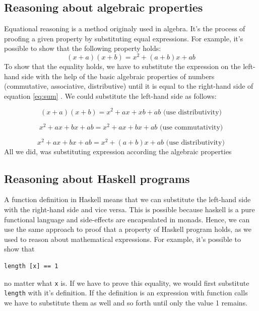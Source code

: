 \subsection{Reasoning about algebraic properties}

Equational reasoning is a method originaly used in algebra. It's the process of proofing a given property by substituting equal expressions.
For example, it's possible to show that the following property holds:
\begin{equation}
  \label{eq:sum}
  (x+a)(x+b) = x^2 + (a+b)x+ab
\end{equation}
To show that the equality holds, we have to substitute the expression on the left-hand side with the help of the basic algebraic properties of numbers (commutative, associative, distributive) until it is equal to the right-hand side of equation \ref{eq:sum} \cite{hutton}. We could substitute the left-hand side as follows:

\begin{equation}
  \label{eq:algebra}
  (x+a)(x+b) = x^2 + ax + xb + ab \text{     (use distributivity)}
\end{equation}

\begin{equation}
x^2 + ax + bx + ab = x^2 + ax + bx + ab \text{     (use commutativity)}
\end{equation}

\begin{equation}
x^2 + ax + bx + ab = x^2 + (a + b)x + ab \text{     (use distributivity)}
\end{equation}
All we did, was substituting expression according the algebraic properties 

\subsection{Reasoning about Haskell programs}

A function definition in Haskell means that we can substitute the left-hand side with the right-hand side and vice versa. This is possible because haskell is a pure functional language and side-effects are encapsulated in monads. Hence, we can use the same approach to proof that a property of Haskell program holds, as we used to reason about mathematical expressions. 
For example, it's possible to show that 
\begin{verbatim}
length [x] == 1
\end{verbatim}
no matter what \verb|x| is. If we have to prove this equality, we would first substitute \verb|length| with it's definition. If the definition is an expression with function calls we have to substitute them as well and so forth until only the value 1 remains.

